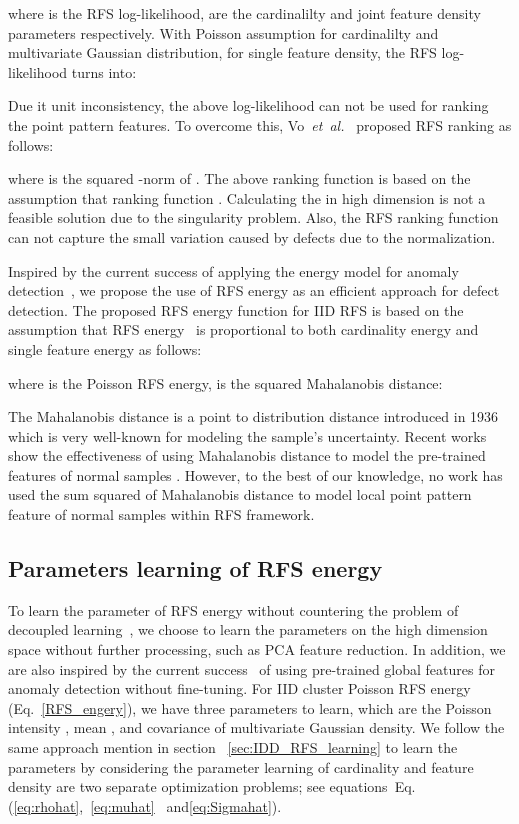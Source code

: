 \documentclass[journal]{IEEEtran}
\newcommand \andothers {\textit{et~al.}}
\begin{document}
where  is the RFS log-likelihood,  are the cardinalilty and joint feature density parameters respectively. With Poisson assumption for cardinalilty and multivariate Gaussian distribution,  for single feature density, the RFS log-likelihood turns into:


Due it unit inconsistency, the above log-likelihood can not be used for ranking the point pattern features. To overcome this, Vo~\andothers~\cite{Vo2018} proposed RFS ranking  as follows:

where  is the squared -norm of . The above ranking function is based on the assumption that ranking function . Calculating the  in high dimension is not a feasible solution due to the singularity problem. Also, the RFS ranking function can not capture the small variation caused by defects due to the  normalization.

Inspired by the current success of applying the energy model for anomaly detection~\cite{zhai2016deep,grathwohl2019your,liu2020energy}, we propose the use of RFS energy as an efficient approach for defect detection.
The proposed RFS energy function for IID RFS is based on the assumption that RFS energy~ is proportional to both cardinality energy and single feature energy as follows:

where  is the Poisson RFS energy,  is the squared Mahalanobis distance:

The Mahalanobis distance is a point to distribution distance introduced in 1936~\cite{mahalanobis1936generalized} which is very well-known for modeling the sample's uncertainty. Recent works show the effectiveness of using Mahalanobis distance to model the pre-trained features of normal samples \cite{christiansen2016deepanomaly,rippel2021modeling}. However, to the best of our knowledge, no work has used the sum squared of Mahalanobis distance to model local point pattern feature of normal samples within RFS framework.

\subsection{Parameters learning of RFS energy}
\label{Sec:RFS_energy_parameter_learning}
To learn the parameter of RFS energy without countering the problem of decoupled learning~\cite{zong2018deep}, we choose to learn the parameters on the high dimension space without further processing, such as PCA feature reduction. In addition, we are also inspired by the current success~\cite{lee2018simple,rippel2021modeling} of using pre-trained global features for anomaly detection without fine-tuning. For IID cluster Poisson RFS energy (Eq.~\ref{RFS_engery}), we have three parameters to learn, which are the Poisson intensity , mean , and covariance  of multivariate Gaussian density. We follow the same approach mention in section ~\ref{sec:IDD_RFS_learning} to learn the parameters by considering the parameter learning of cardinality and feature density are two separate optimization problems; see equations~Eq. (\ref{eq:rhohat},~\ref{eq:muhat}~ and\ref{eq:Sigmahat}).
\end{document}
